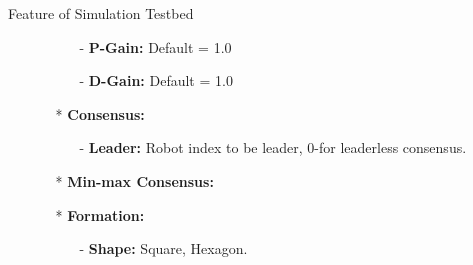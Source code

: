 \documentclass[10pt]{beamer}
\begin{document}
\begin{frame}{Feature of Simulation Testbed}
\begin{minipage}{0.47\textwidth}
\begin{itemize}
\begin{itemize}
\begin{itemize}
                \item[-] \textbf{P-Gain: }Default = 1.0
                \item[-] \textbf{D-Gain: }Default = 1.0
            \end{itemize}
            \item[*] \textbf{Consensus: }
            \begin{itemize}
                \item[-] \textbf{Leader: }Robot index to be leader, 0-for leaderless consensus.
            \end{itemize}
            \item[*] \textbf{Min-max Consensus: }
            \item[*] \textbf{Formation: }
            \begin{itemize}
                \item[-] \textbf{Shape: }Square, Hexagon.
            \end{itemize}
        \end{itemize}
    \end{itemize}
\end{minipage}  
\end{frame}
\end{document}
